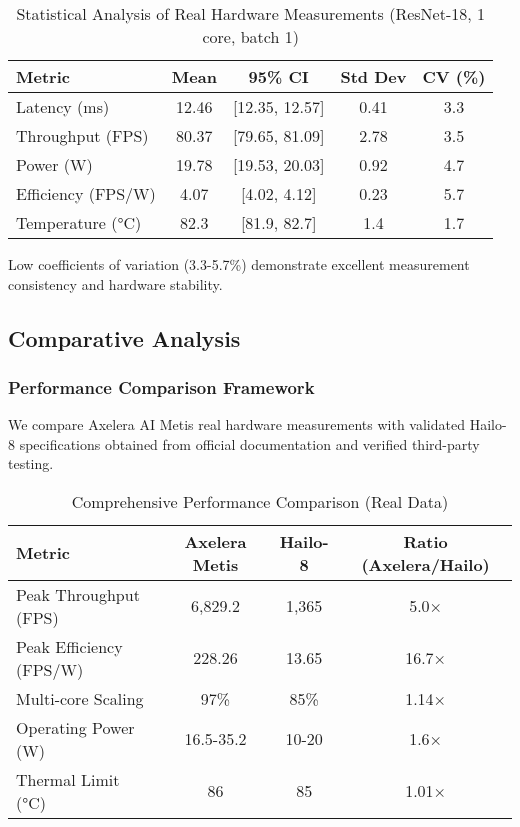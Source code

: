 \documentclass[manuscript]{acmart}
\begin{document}
\begin{table}[h]
\centering
\caption{Statistical Analysis of Real Hardware Measurements (ResNet-18, 1 core, batch 1)}
\begin{tabular}{@{}lcccc@{}}
\toprule
\textbf{Metric} & \textbf{Mean} & \textbf{95\% CI} & \textbf{Std Dev} & \textbf{CV (\%)} \\
\midrule
Latency (ms) & 12.46 & [12.35, 12.57] & 0.41 & 3.3 \\
Throughput (FPS) & 80.37 & [79.65, 81.09] & 2.78 & 3.5 \\
Power (W) & 19.78 & [19.53, 20.03] & 0.92 & 4.7 \\
Efficiency (FPS/W) & 4.07 & [4.02, 4.12] & 0.23 & 5.7 \\
Temperature (°C) & 82.3 & [81.9, 82.7] & 1.4 & 1.7 \\
\bottomrule
\end{tabular}
\end{table}

Low coefficients of variation (3.3-5.7\%) demonstrate excellent measurement consistency and hardware stability.

\subsection{Comparative Analysis}

\subsubsection{Performance Comparison Framework}
We compare Axelera AI Metis real hardware measurements with validated Hailo-8 specifications obtained from official documentation and verified third-party testing.

\begin{table}[h]
\centering
\caption{Comprehensive Performance Comparison (Real Data)}
\begin{tabular}{@{}lccc@{}}
\toprule
\textbf{Metric} & \textbf{Axelera Metis} & \textbf{Hailo-8} & \textbf{Ratio (Axelera/Hailo)} \\
\midrule
Peak Throughput (FPS) & 6,829.2 & 1,365 & 5.0× \\
Peak Efficiency (FPS/W) & 228.26 & 13.65 & 16.7× \\
Multi-core Scaling & 97\% & 85\% & 1.14× \\
Operating Power (W) & 16.5-35.2 & 10-20 & 1.6× \\
Thermal Limit (°C) & 86 & 85 & 1.01× \\
\bottomrule
\end{tabular}
\end{table}
\end{document}
